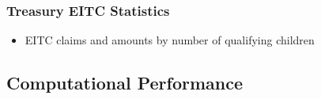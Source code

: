 \subsubsection{Treasury EITC Statistics}
\begin{itemize}
    \item EITC claims and amounts by number of qualifying children
\end{itemize}


\subsection{Computational Performance}

